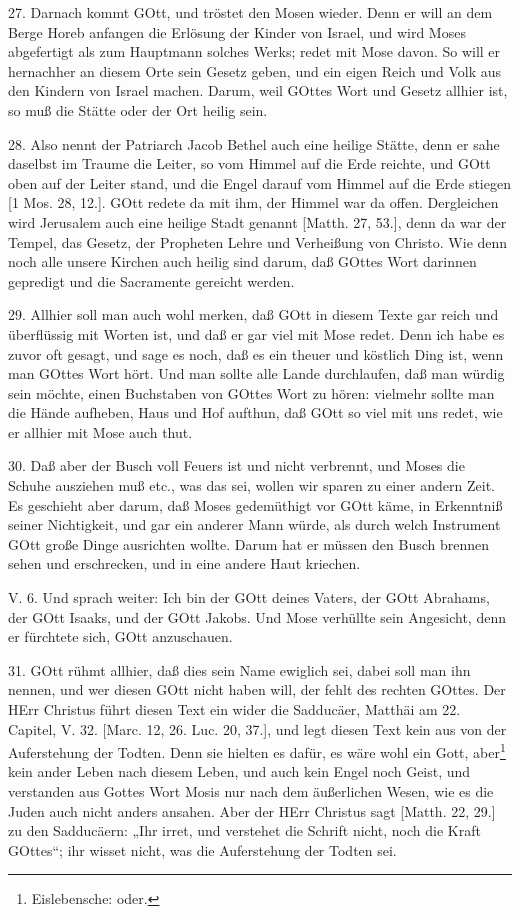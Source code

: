 27. Darnach kommt GOtt, und tröstet den Mosen wieder. Denn er will an dem Berge Horeb anfangen die Erlösung der Kinder von Israel, und wird Moses abgefertigt als zum Hauptmann solches Werks; redet mit Mose davon. So will er hernachher an diesem Orte sein Gesetz geben, und ein eigen Reich und Volk aus den Kindern von Israel machen. Darum, weil GOttes Wort und Gesetz allhier ist, so muß die Stätte oder der Ort heilig sein.

28. Also nennt der Patriarch Jacob Bethel auch eine heilige Stätte, denn er sahe daselbst im Traume die Leiter, so vom Himmel auf die Erde reichte, und GOtt oben auf der Leiter stand, und die Engel darauf vom Himmel auf die Erde stiegen [1 Mos. 28, 12.]. GOtt redete da mit ihm, der Himmel war da offen. Dergleichen wird Jerusalem auch eine heilige Stadt genannt [Matth. 27, 53.], denn da war der
Tempel, das Gesetz, der Propheten Lehre und Verheißung von Christo. Wie denn noch alle unsere Kirchen auch heilig sind darum, daß GOttes Wort darinnen gepredigt und die Sacramente gereicht werden.

29. Allhier soll man auch wohl merken, daß GOtt in diesem Texte gar reich und überflüssig mit Worten ist, und daß er gar viel mit Mose redet. Denn ich habe es zuvor oft gesagt, und sage es noch, daß es ein theuer und köstlich Ding ist, wenn man GOttes Wort hört. Und man sollte alle Lande durchlaufen, daß man würdig sein möchte, einen Buchstaben von GOttes Wort zu hören: vielmehr sollte man die Hände aufheben, Haus und Hof aufthun, daß GOtt so viel mit uns redet, wie er allhier mit Mose auch thut.

30. Daß aber der Busch voll Feuers ist und nicht verbrennt, und Moses die Schuhe ausziehen muß etc., was das sei, wollen wir sparen zu einer andern Zeit. Es geschieht aber darum, daß Moses gedemüthigt vor GOtt käme, in Erkenntniß seiner Nichtigkeit, und gar ein anderer Mann würde, als durch welch Instrument GOtt große Dinge ausrichten wollte. Darum hat er müssen den Busch brennen sehen und erschrecken, und in eine andere Haut kriechen.

\begin{schriftzitat}
V. 6. Und sprach weiter: Ich bin der GOtt deines Vaters, der GOtt Abrahams, der GOtt Isaaks, und der GOtt Jakobs. Und Mose verhüllte sein Angesicht, denn er fürchtete sich, GOtt anzuschauen.
\end{schriftzitat}

31. GOtt rühmt allhier, daß dies sein Name ewiglich sei, dabei soll man ihn nennen, und wer diesen GOtt nicht haben will, der fehlt des rechten GOttes. Der HErr Christus führt diesen Text ein wider die Sadducäer, Matthäi am 22. Capitel, V. 32. [Marc. 12, 26. Luc. 20, 37.], und legt diesen Text kein aus von der Auferstehung der Todten. Denn sie hielten es dafür, es wäre wohl ein Gott, aber\footnote{Eislebensche: oder.} kein ander Leben nach diesem Leben, und auch kein Engel noch Geist, und verstanden aus Gottes Wort Mosis nur nach dem äußerlichen Wesen, wie es die Juden auch nicht anders ansahen. Aber der HErr Christus sagt [Matth. 22, 29.] zu den Sadducäern: „Ihr irret, und verstehet die Schrift nicht, noch die Kraft GOttes“; ihr wisset nicht, was die Auferstehung der Todten sei.

